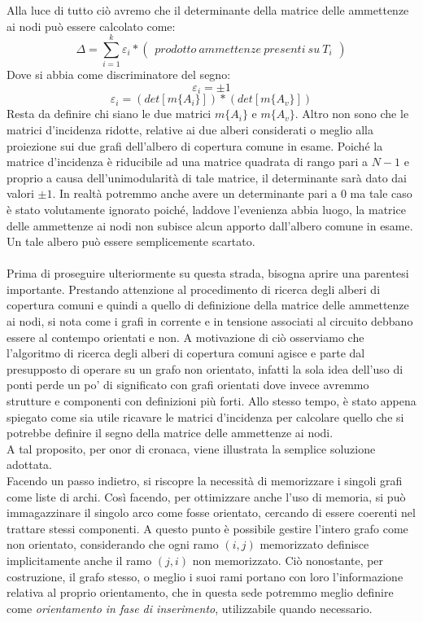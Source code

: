Alla luce di tutto ciò avremo che il determinante della matrice delle ammettenze ai nodi può essere calcolato come:
$$
\Delta =
\sum_{i = 1}^k{
  \varepsilon_i\ast\left(\begin{array}{c}
    prodotto~ammettenze~presenti~su~T_i
  \end{array}\right)
}
$$
Dove si abbia come discriminatore del segno:
$$ \varepsilon_i = \pm 1 $$
$$ \varepsilon_i = \left( det\left[ m\{ A_i \} \right] \right)\ast\left( det\left[ m\{ A_v \} \right] \right) $$
Resta da definire chi siano le due matrici $m\{ A_i \}$ e $m\{ A_v \}$. Altro non sono che le matrici d'incidenza ridotte, relative ai due alberi considerati o meglio alla proiezione sui due grafi dell'albero di copertura comune in esame. Poiché la matrice d'incidenza è riducibile ad una matrice quadrata di rango pari a $N-1$ e proprio a causa dell'unimodularità di tale matrice, il determinante sarà dato dai valori $\pm 1$. In realtà potremmo anche avere un determinante pari a $0$ ma tale caso è stato volutamente ignorato poiché, laddove l'evenienza abbia luogo, la matrice delle ammettenze ai nodi non subisce alcun apporto dall'albero comune in esame. Un tale albero può essere semplicemente scartato.

\paragraph{}
Prima di proseguire ulteriormente su questa strada, bisogna aprire una parentesi importante. Prestando attenzione al procedimento di ricerca degli alberi di copertura comuni e quindi a quello di definizione della matrice delle ammettenze ai nodi, si nota come i grafi in corrente e in tensione associati al circuito debbano essere al contempo orientati e non. A motivazione di ciò osserviamo che l'algoritmo di ricerca degli alberi di copertura comuni agisce e parte dal presupposto di operare su un grafo non orientato, infatti la sola idea dell'uso di ponti perde un po' di significato con grafi orientati dove invece avremmo strutture e componenti con definizioni più forti. Allo stesso tempo, è stato appena spiegato come sia utile ricavare le matrici d'incidenza per calcolare quello che si potrebbe definire il segno della matrice delle ammettenze ai nodi.\\
A tal proposito, per onor di cronaca, viene illustrata la semplice soluzione adottata.\\
Facendo un passo indietro, si riscopre la necessità di memorizzare i singoli grafi come liste di archi. Così facendo, per ottimizzare anche l'uso di memoria, si può immagazzinare il singolo arco come fosse orientato, cercando di essere coerenti nel trattare stessi componenti. A questo punto è possibile gestire l'intero grafo come non orientato, considerando che ogni ramo $\left( i, j\right)$ memorizzato definisce implicitamente anche il ramo $\left( j, i\right)$ non memorizzato. Ciò nonostante, per costruzione, il grafo stesso, o meglio i suoi rami portano con loro l'informazione relativa al proprio orientamento, che in questa sede potremmo meglio definire come \textit{orientamento in fase di inserimento}, utilizzabile quando necessario.

